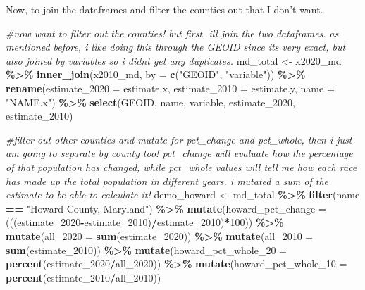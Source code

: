 \documentclass[
]{article}
\newenvironment{Shaded}{\begin{snugshade}}{\end{snugshade}}
\newcommand{\AttributeTok}[1]{\textcolor[rgb]{0.13,0.29,0.53}{#1}}
\newcommand{\CommentTok}[1]{\textcolor[rgb]{0.56,0.35,0.01}{\textit{#1}}}
\newcommand{\DecValTok}[1]{\textcolor[rgb]{0.00,0.00,0.81}{#1}}
\newcommand{\FunctionTok}[1]{\textcolor[rgb]{0.13,0.29,0.53}{\textbf{#1}}}
\newcommand{\NormalTok}[1]{#1}
\newcommand{\OtherTok}[1]{\textcolor[rgb]{0.56,0.35,0.01}{#1}}
\newcommand{\SpecialCharTok}[1]{\textcolor[rgb]{0.81,0.36,0.00}{\textbf{#1}}}
\newcommand{\StringTok}[1]{\textcolor[rgb]{0.31,0.60,0.02}{#1}}
\begin{document}
Now, to join the dataframes and filter the counties out that I don't
want.

\begin{Shaded}
\begin{Highlighting}[]
\CommentTok{\#now want to filter out the counties! but first, i\textquotesingle{}ll join the two dataframes. as mentioned before, i like doing this through the GEOID since it\textquotesingle{}s very exact, but also joined by variables so i didn\textquotesingle{}t get any duplicates.}
\NormalTok{md\_total }\OtherTok{\textless{}{-}}\NormalTok{ x2020\_md }\SpecialCharTok{\%\textgreater{}\%} 
  \FunctionTok{inner\_join}\NormalTok{(x2010\_md, }\AttributeTok{by =} \FunctionTok{c}\NormalTok{(}\StringTok{"GEOID"}\NormalTok{, }\StringTok{"variable"}\NormalTok{)) }\SpecialCharTok{\%\textgreater{}\%} 
  \FunctionTok{rename}\NormalTok{(}\AttributeTok{estimate\_2020 =}\NormalTok{ estimate.x, }
         \AttributeTok{estimate\_2010 =}\NormalTok{ estimate.y,}
         \AttributeTok{name =} \StringTok{"NAME.x"}\NormalTok{) }\SpecialCharTok{\%\textgreater{}\%}
  \FunctionTok{select}\NormalTok{(GEOID, name, variable, estimate\_2020, estimate\_2010)}

\CommentTok{\#filter out other counties and mutate for pct\_change and pct\_whole, then i just am going to separate by county too! pct\_change will evaluate how the percentage of that population has changed, while pct\_whole values will tell me how each race has made up the total population in different years. i mutated a sum of the estimate to be able to calculate it!}
\NormalTok{demo\_howard }\OtherTok{\textless{}{-}}\NormalTok{ md\_total }\SpecialCharTok{\%\textgreater{}\%} 
  \FunctionTok{filter}\NormalTok{(name }\SpecialCharTok{==} \StringTok{"Howard County, Maryland"}\NormalTok{) }\SpecialCharTok{\%\textgreater{}\%} 
  \FunctionTok{mutate}\NormalTok{(}\AttributeTok{howard\_pct\_change =}\NormalTok{ (((estimate\_2020}\SpecialCharTok{{-}}\NormalTok{estimate\_2010)}\SpecialCharTok{/}\NormalTok{estimate\_2010)}\SpecialCharTok{*}\DecValTok{100}\NormalTok{)) }\SpecialCharTok{\%\textgreater{}\%}
  \FunctionTok{mutate}\NormalTok{(}\AttributeTok{all\_2020 =} \FunctionTok{sum}\NormalTok{(estimate\_2020)) }\SpecialCharTok{\%\textgreater{}\%} 
  \FunctionTok{mutate}\NormalTok{(}\AttributeTok{all\_2010 =} \FunctionTok{sum}\NormalTok{(estimate\_2010)) }\SpecialCharTok{\%\textgreater{}\%} 
  \FunctionTok{mutate}\NormalTok{(}\AttributeTok{howard\_pct\_whole\_20 =} \FunctionTok{percent}\NormalTok{(estimate\_2020}\SpecialCharTok{/}\NormalTok{all\_2020)) }\SpecialCharTok{\%\textgreater{}\%} 
  \FunctionTok{mutate}\NormalTok{(}\AttributeTok{howard\_pct\_whole\_10 =} \FunctionTok{percent}\NormalTok{(estimate\_2010}\SpecialCharTok{/}\NormalTok{all\_2010))}


\end{Highlighting}
\end{Shaded}
\end{document}
